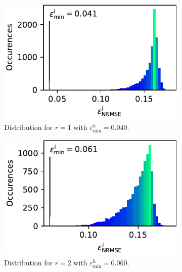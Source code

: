 \documentclass[
  a4paper,  %
  twoside,  %
  bibliography=totoc,
  headsepline,
  cleardoublepage=empty,
  parskip=half,
  draft=false
]{scrbook}
\begin{document}
\newpage
\begin{mdframed}[style=style]
\begin{figure}[H]
  \centering
    \begin{subfigure}{.5\textwidth}
  \centering
   \includegraphics[width=0.95\linewidth]{graphics/ww_hist_1}
  \caption{Distribution for $r=1$ with $\varepsilon^\mathrm{h}_{\mathrm{min}}=0.040$.}
\vspace{3mm}
\label{fig:ww_hist_1}
\end{subfigure}%
\begin{subfigure}{.5\textwidth}
  \centering
   \includegraphics[width=0.95\linewidth]{graphics/ww_hist_2}
  \caption{Distribution for $r=2$ with $\varepsilon^\mathrm{h}_{\mathrm{min}}=0.060$.}
\vspace{3mm}
\label{fig:ww_hist_2}
\end{subfigure}%
\vspace{3mm}
  \begin{subfigure}{.5\textwidth}

\end{subfigure}
\end{figure}
\end{mdframed}
\end{document}
